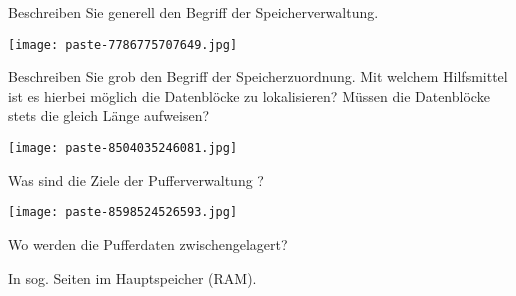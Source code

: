 \documentclass{article}
\begin{document}
\begin{tcolorbox}[colback=white!10!white,colframe=lightgray!75!black,
  savelowerto=\jobname_ex.tex]

\begin{center}
 Beschreiben Sie generell den Begriff der Speicherverwaltung. 

\end{center}

\tcblower

\justifying
\texttt{[image: paste-7786775707649.jpg]}

\end{tcolorbox}
\begin{tcolorbox}[colback=white!10!white,colframe=lightgray!75!black,
  savelowerto=\jobname_ex.tex]

\begin{center}
 Beschreiben Sie grob den Begriff der Speicherzuordnung. Mit welchem Hilfsmittel ist es hierbei möglich die Datenblöcke zu lokalisieren? Müssen die Datenblöcke stets die gleich Länge aufweisen? 

\end{center}

\tcblower

\justifying
\texttt{[image: paste-8504035246081.jpg]}

\end{tcolorbox}
\begin{tcolorbox}[colback=white!10!white,colframe=lightgray!75!black,
  savelowerto=\jobname_ex.tex]

\begin{center}
 Was sind die Ziele der 
Pufferverwaltung
? 

\end{center}

\tcblower

\justifying
\texttt{[image: paste-8598524526593.jpg]}

\end{tcolorbox}
\begin{tcolorbox}[colback=white!10!white,colframe=lightgray!75!black,
  savelowerto=\jobname_ex.tex]

\begin{center}
 Wo werden die Pufferdaten zwischengelagert? 

\end{center}

\tcblower

\justifying
In sog. 
Seiten
im Hauptspeicher (RAM).

\end{tcolorbox}
\end{document}
